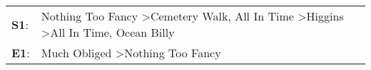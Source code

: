 \begin{supertabular}{p{0.03\textwidth}p{0.92\textwidth}}
 \textbf{S1}:  &  Nothing Too Fancy\textsuperscript{} \textgreater \enspace Cemetery Walk\textsuperscript{}, \enspace All In Time\textsuperscript{} \textgreater \enspace Higgins\textsuperscript{} \textgreater \enspace All In Time\textsuperscript{}, \enspace Ocean Billy\textsuperscript{}  \enspace  \\
 \textbf{E1}:  &                                                                                                                                                                                       Much Obliged\textsuperscript{} \textgreater \enspace Nothing Too Fancy\textsuperscript{}  \enspace  \\
\end{supertabular}
